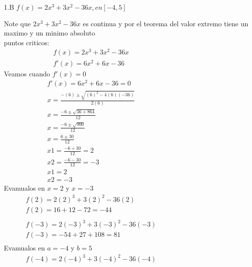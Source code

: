 \documentclass{report}
\begin{document}
{\Large 1.B $ f(x) = 2x^3+ 3x^2 -36x , en [-4,5] $ \par}
{\Large\justify
Note que $  2x^3+ 3x^2 -36x$ es continua y por el teorema del valor extremo
tiene un maximo y un minimo absoluto \\
puntos criticos:
\begin{align*}
     & f(x) = 2x^3 +3x^2 -36x     &  &  &  &  &  &  &  &  &  &  &  &  &  & \\
     & f'(x)= 6x^2 + 6x -36                                                   
\end{align*}
Veamos cuando $f'(x) = 0$
\begin{align*}
     & f'(x)= 6x^2 + 6x -36 = 0   &  &  &  &  &  &  &  &  &  &  &  &  &  &    \\
     & x = \frac{ -(6) \pm \sqrt{(6)^2 -4(6)(-36)}} {2(6)}                     \\
     & x = \frac{ -6 \pm\sqrt{36 + 864}} { 12}                                  \\
     & x =  \frac{ -6 \pm\sqrt{900}} { 12}                                        \\
     & x = \frac{6\pm30}{12}                                                     \\
     & x1 = \frac {-6 + 30}{12} = 2                                                      \\
     & x2 = \frac{ -6 -30}{12} = -3                                                      \\
     & x1 = 2                                                                    \\
     & x2 = -3
\end{align*}
Evamualos en $ x = 2 $ y $ x = -3 $
\begin{align*}
     & f(2) = 2(2)^3 +3(2)^2 -36(2)      &  &  &  &  &  &  &  &  &  &  &  &  &  & \\
     & f(2) = 16 + 12 -72  = -44                                                    \\\\
     & f(-3) = 2(-3)^3 +3(-3)^2 -36(-3)                                           \\
     & f(-3) = -54  + 27 + 108 = 81                                                   \\
\end{align*}
Evamualos en $ a = -4  $ y $ b = 5 $
\begin{align*}
     & f(-4) = 2(-4)^3 +3(-4)^2 -36(-4)      &  &  &  &  &  &  &  &  &  &  &  &  &  & \\

\end{align*}}
\end{document}
